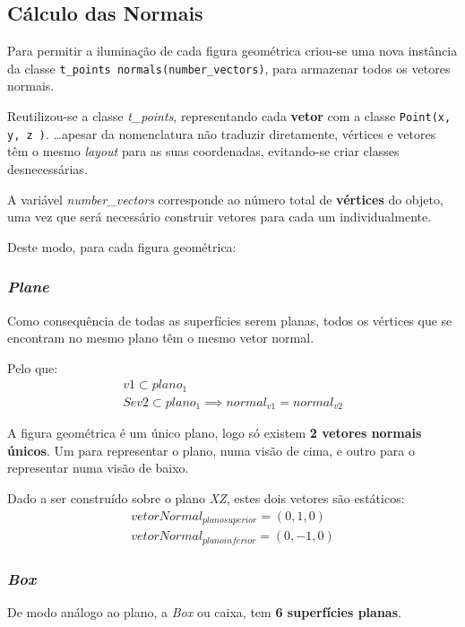 \documentclass[relatorio.tex]{subfiles}
\begin{document}
    
\subsection{Cálculo das Normais} \label{subsec:normals}
Para permitir a iluminação de cada figura geométrica 
criou-se uma nova instância da classe 
\texttt{t_points normals(number_vectors)}, 
para armazenar todos os vetores normais.

Reutilizou-se a classe \textit{t\_points},
representando cada \textbf{vetor} com
a classe \texttt{Point(x, y, z )}.
\dots apesar da nomenclatura não traduzir
diretamente, vértices e vetores têm o mesmo 
\textit{layout} para as suas coordenadas, 
evitando-se criar classes desnecessárias.

A variável \textit{number\_vectors} corresponde ao 
número total de \textbf{vértices} do objeto, uma vez 
que será necessário construir vetores para cada um 
individualmente.

Deste modo, para cada figura geométrica:

\subsubsection{\textit{Plane}}
Como consequência de todas as superfícies serem planas, 
todos os vértices que se encontram no mesmo plano
têm o mesmo vetor normal.

Pelo que:
\begin{eqnarray}
    v1 \subset plano_{1} \\
    Se v2\subset plano_{1} \implies normal_{v1} = normal_{v2}
\end{eqnarray}

A figura geométrica é um único plano, 
logo só existem \textbf{2 vetores normais únicos}.
Um para representar o plano, numa visão de cima,
e outro para o representar numa visão de baixo.

Dado a ser construído sobre o plano \textit{XZ}, 
estes dois vetores são estáticos:
\begin{eqnarray}
    vetorNormal_{plano superior} = (0,1,0) \\
    vetorNormal_{plano inferior} = (0,-1,0) 
\end{eqnarray}

\subsubsection{\textit{Box}}

De modo análogo ao plano, a \textit{Box} ou caixa, 
tem \textbf{6 superfícies planas}.
\end{document}
